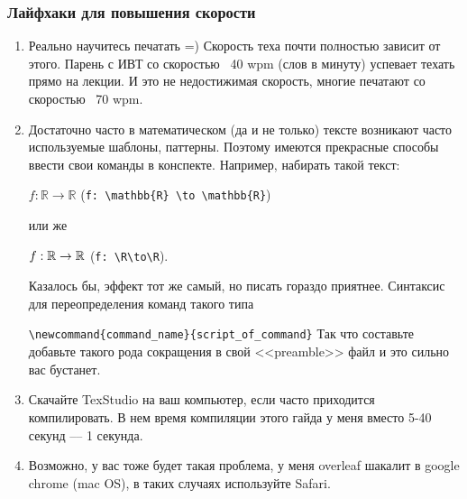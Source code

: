 \subsubsection{Лайфхаки для повышения скорости}
\begin{enumerate}
	\item Реально научитесь печатать =) Скорость теха почти полностью зависит от этого. Парень с ИВТ со скоростью ~40 wpm (слов в минуту) успевает техать прямо на лекции. И это не недостижимая скорость, многие печатают со скоростью ~70 wpm.
	
	\item Достаточно часто в математическом (да и не только) тексте возникают часто используемые шаблоны, паттерны. Поэтому имеются прекрасные способы ввести свои команды в конспекте. Например, набирать такой текст: 
	
	$f: \mathbb{R} \to \mathbb{R}$ (\verb|f: \mathbb{R} \to \mathbb{R}|) 
	
	или же
	
	$f: \mathbb{R}\to\mathbb{R}$ (\verb|f: \R\to\R|).
	
	Казалось бы, эффект тот же самый, но писать гораздо приятнее. 
	Синтаксис для переопределения команд такого типа  
	
	\verb|\newcommand{command_name}{script_of_command}|
	Так что составьте добавьте такого рода сокращения в свой <<preamble>> файл и это сильно вас бустанет. 
	
	\item Скачайте TexStudio на ваш компьютер, если часто приходится компилировать. 
	В нем время компиляции этого гайда у меня вместо 5-40 секунд –– 1 секунда.
	
	\item Возможно, у вас тоже будет такая проблема, у меня overleaf шакалит в google chrome (mac OS), в таких случаях используйте Safari. 
\end{enumerate}

